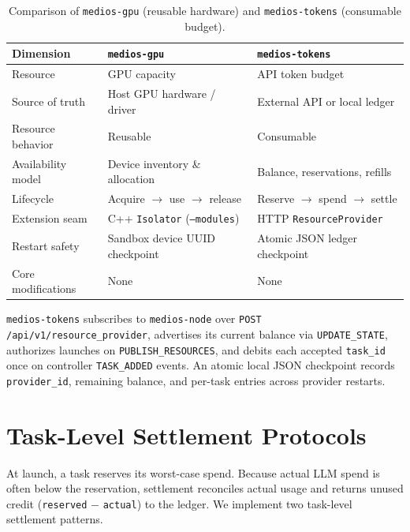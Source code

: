 \documentclass[11pt]{article}
\begin{document}
\begin{table}[htbp]
\centering
\small
\begin{tabular}{@{}lll@{}}
\toprule
\textbf{Dimension} & \textbf{\texttt{medios-gpu}} & \textbf{\texttt{medios-tokens}} \\
\midrule
Resource & GPU capacity & API token budget \\
Source of truth & Host GPU hardware / driver & External API or local ledger \\
Resource behavior & Reusable & Consumable \\
Availability model & Device inventory \& allocation & Balance, reservations, refills \\
Lifecycle & Acquire $\rightarrow$ use $\rightarrow$ release & Reserve $\rightarrow$ spend $\rightarrow$ settle \\
Extension seam & C++ \texttt{Isolator} (\texttt{--modules}) & HTTP \texttt{ResourceProvider} \\
Restart safety & Sandbox device UUID checkpoint & Atomic JSON ledger checkpoint \\
Core modifications & None & None \\
\bottomrule
\end{tabular}
\caption{Comparison of \texttt{medios-gpu} (reusable hardware) and \texttt{medios-tokens} (consumable budget).}
\label{tab:pair}
\end{table}

\texttt{medios-tokens} subscribes to \texttt{medios-node} over \texttt{POST /api/v1/resource\_provider}, advertises its current balance via \texttt{UPDATE\_STATE}, authorizes launches on \texttt{PUBLISH\_RESOURCES}, and debits each accepted \texttt{task\_id} once on controller \texttt{TASK\_ADDED} events. An atomic local JSON checkpoint records \texttt{provider\_id}, remaining balance, and per-task entries across provider restarts.

\section{Task-Level Settlement Protocols}
\label{sec:settle}

At launch, a task reserves its worst-case spend. Because actual LLM spend is often below the reservation, settlement reconciles actual usage and returns unused credit (\texttt{reserved} $-$ \texttt{actual}) to the ledger. We implement two task-level settlement patterns.
\end{document}
